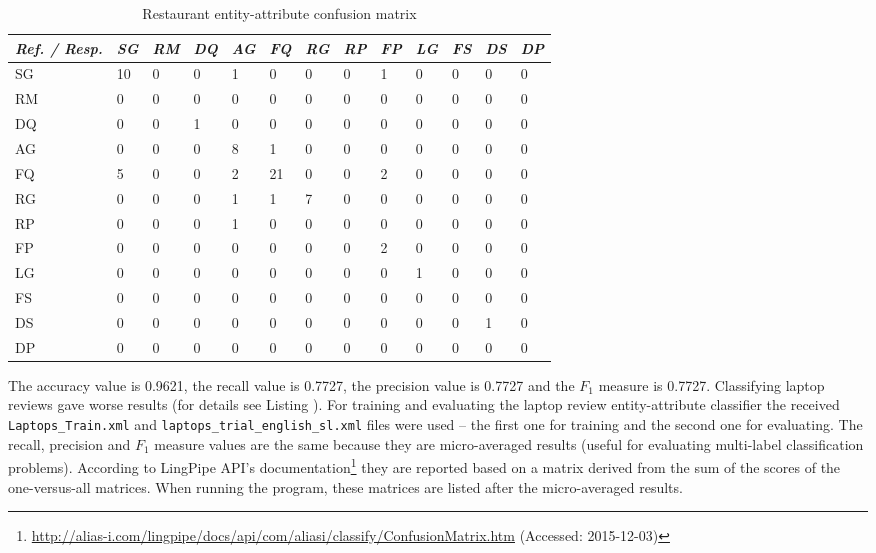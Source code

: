 \begin{table}[ht]
\footnotesize
\centering
\begin{tabular}{lllllllllllll}
\toprule
  \emph{Ref. / Resp.} & \emph{SG} & \emph{RM} & \emph{DQ} & \emph{AG} &
  \emph{FQ} & \emph{RG} & \emph{RP} & \emph{FP} & \emph{LG} &
  \emph{FS} & \emph{DS} & \emph{DP}\\
\midrule
  SG&10&0&0&1&0&0&0&1&0&0&0&0\\
  RM&0&0&0&0&0&0&0&0&0&0&0&0\\
  DQ&0&0&1&0&0&0&0&0&0&0&0&0\\
  AG&0&0&0&8&1&0&0&0&0&0&0&0\\
  FQ&5&0&0&2&21&0&0&2&0&0&0&0\\
  RG&0&0&0&1&1&7&0&0&0&0&0&0\\
  RP&0&0&0&1&0&0&0&0&0&0&0&0\\
  FP&0&0&0&0&0&0&0&2&0&0&0&0\\
  LG&0&0&0&0&0&0&0&0&1&0&0&0\\
  FS&0&0&0&0&0&0&0&0&0&0&0&0\\
  DS&0&0&0&0&0&0&0&0&0&0&1&0\\
  DP&0&0&0&0&0&0&0&0&0&0&0&0\\
\bottomrule
\hline
\end{tabular}
\caption{Restaurant entity-attribute confusion matrix}
\label{tab:confMatrix}
\end{table}

The accuracy value is 0.9621, the recall value is 0.7727, the precision value is
0.7727 and the $F_1$ measure is 0.7727. Classifying laptop reviews gave
worse results (for details see Listing ).
For training and evaluating the laptop review entity-attribute classifier the
received \texttt{Laptops\_Train.xml} and
\texttt{laptops\_trial\_english\_sl.xml} files were used -- the first one for
training and the second one for evaluating. The recall, precision and $F_1$
measure values are the same because they are micro-averaged results (useful for
evaluating multi-label classification problems). According to LingPipe API's
documentation\footnote{\url{http://alias-i.com/lingpipe/docs/api/com/aliasi/classify/ConfusionMatrix.htm}
(Accessed: 2015-12-03)} they are reported based on a matrix derived from the sum
of the scores of the one-versus-all matrices. When running the program, these matrices
are listed after the micro-averaged results.

